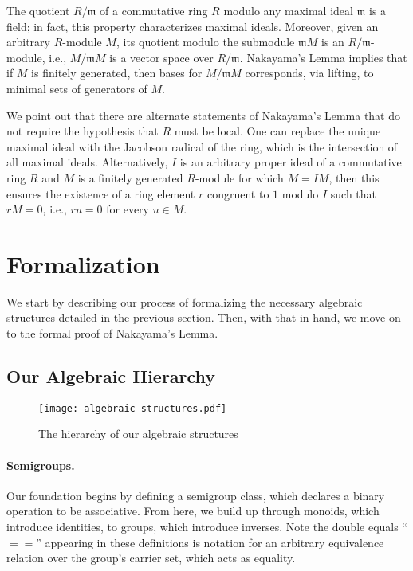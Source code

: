 \documentclass{article}
\begin{document}
The quotient $R/\mathfrak{m}$ of a commutative ring $R$ modulo any maximal ideal 
$\mathfrak{m}$ is a field; in fact, this property characterizes maximal ideals. 
Moreover, given an arbitrary $R$-module $M$, its quotient modulo the
submodule $\mathfrak{m}M$ is an $R/\mathfrak{m}$-module, i.e.,
$M/\mathfrak{m}M$ is a vector space over $R/\mathfrak{m}$. Nakayama's Lemma
implies that if $M$ is finitely generated, then bases for $M/\mathfrak{m}M$
corresponds, via lifting, to minimal sets of generators of $M$. 

We point out that there are alternate statements of Nakayama's Lemma that do
not require the hypothesis that $R$ must be local. One can replace the unique
maximal ideal with the Jacobson radical of the ring, which is the intersection
of all maximal ideals. Alternatively, $I$ is an arbitrary proper ideal of a
commutative ring $R$ and $M$ is a finitely generated $R$-module for which
$M=I M$, then this ensures the existence of a ring element $r$ congruent to
$1$ modulo $I$ such that $r M = 0$, i.e., $r u = 0$ for every $u \in M$. 

\section{Formalization}
We start by describing our process of formalizing the necessary algebraic
structures detailed in the previous section. Then, with that in hand, we move
on to the formal proof of Nakayama's Lemma.

\subsection{Our Algebraic Hierarchy}
\begin{figure}[t]
  \caption{The hierarchy of our algebraic structures}
  \texttt{[image: algebraic-structures.pdf]}
  \centering
\end{figure}

\paragraph{Semigroups.} Our foundation begins by defining a semigroup class, which declares a binary
operation to be associative. From here, we build up through monoids, which
introduce identities, to groups, which introduce inverses. Note the double
equals ``$==$'' appearing in these definitions is notation for an arbitrary
equivalence relation over the group's carrier set, which acts as equality.
\end{document}
